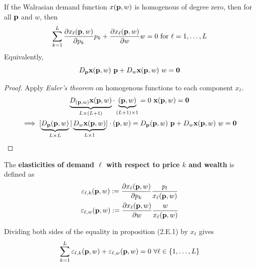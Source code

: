 \documentclass{report}
\begin{document}
 			\begin{proposition}[2.E.1]
 				If the Walrasian demand function $x(\textbf{p}, w)$ is homogenous of degree zero, then for all $\textbf{p}$ and $w$, then
 				\begin{equation}
 					\sum_{k=1}^{L} \frac{\partial x_{\ell}(\textbf{p}, w)}{\partial p_{k}} p_{k}+\frac{\partial x_{\ell}(\textbf{p}, w)}{\partial w} w=0 \text { for } \ell=1, \ldots, L
 				\end{equation}
 				Equivalently,
 				\begin{equation}
 					D_{\textbf{p}} \textbf{x} (\textbf{p}, w)\ \textbf{p} + D_w \textbf{x}(\textbf{p}, w)\ w = \textbf{0}
 				\end{equation}
 				\begin{proof}
 					Apply \emph{Euler's theorem} on homogenous functions to each component $x_\ell$.
 					\begin{gather}
 						\underbrace{D_{(\vep, w)} \vex(\vep, w)}_{L \times (L+1)} \cdot \underbrace{(\vep, w)}_{(L+1) \times 1} = 0\ \vex(\vep, w) = \ve{0} \\
 						\implies [\underbrace{D_{\vep} (\vep, w)}_{L \times L} | \underbrace{D_w \vex(\vep, w)}_{L \times 1}] \cdot (\vep, w) = D_{\vep} (\vep, w)\ \vep + D_w \vex(\vep, w)\ w = \ve{0}
 					\end{gather}
 				\end{proof}
 			\end{proposition}
 			
 			\begin{definition}
 				The \textbf{elasticities of demand $\ell$ with respect to price $k$ and wealth} is defined as 
 				\begin{gather}
 					\varepsilon_{\ell, k} (\textbf{p}, w) := \frac{\partial{x_\ell (\textbf{p}, w)}}{\partial{p_k}} \frac{p_l}{x_\ell (\textbf{p}, w)}\\
 					\varepsilon_{\ell, w} (\textbf{p}, w) := \frac{\partial{x_\ell (\textbf{p}, w)}}{\partial{w}} \frac{w}{x_\ell (\textbf{p}, w)}
 				\end{gather}
 			\end{definition}
 			
  			\begin{corollary}
  				Dividing both sides of the equality in proposition (2.E.1) by $x_{\ell}$ gives
 				\begin{equation}
 					\sum_{k=1}^L \varepsilon_{\ell, k}(\textbf{p}, w) + \varepsilon_{\ell, w}(\textbf{p}, w) = 0\ \forall \ell \in \{1, \ldots, L\}
 				\end{equation}
 			\end{corollary}
 			
\end{document}

